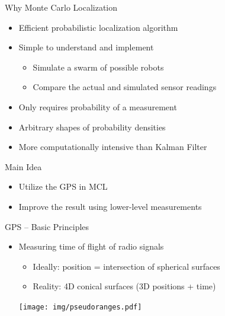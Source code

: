 \documentclass[utf8,12pt]{beamer}
\begin{document}
{
\begin{frame}{Why Monte Carlo Localization}
    \begin{itemize}
        \item Efficient probabilistic localization algorithm
        \item Simple to understand and implement
        \begin{itemize}
            \item Simulate a swarm of possible robots
            \item Compare the actual and simulated sensor readings
        \end{itemize}
        \item Only requires probability of a measurement
        \item Arbitrary shapes of probability densities
        \item More computationally intensive than Kalman Filter
    \end{itemize}
\end{frame}
}

\begin{frame}{Main Idea}
    \begin{itemize}
        \item Utilize the GPS in MCL
        \item Improve the result using lower-level measurements
    \end{itemize}
\end{frame}

{
\begin{frame}{GPS -- Basic Principles}
    \begin{itemize}
        \item Measuring time of flight of radio signals
        \begin{itemize}
            \item Ideally: position = intersection of spherical surfaces
            \item Reality: 4D conical surfaces (3D positions + time)
        \end{itemize}
    \vspace{0.5cm}
    \centerline{\texttt{[image: img/pseudoranges.pdf]}}
    \end{itemize}
\end{frame}
}
\end{document}
